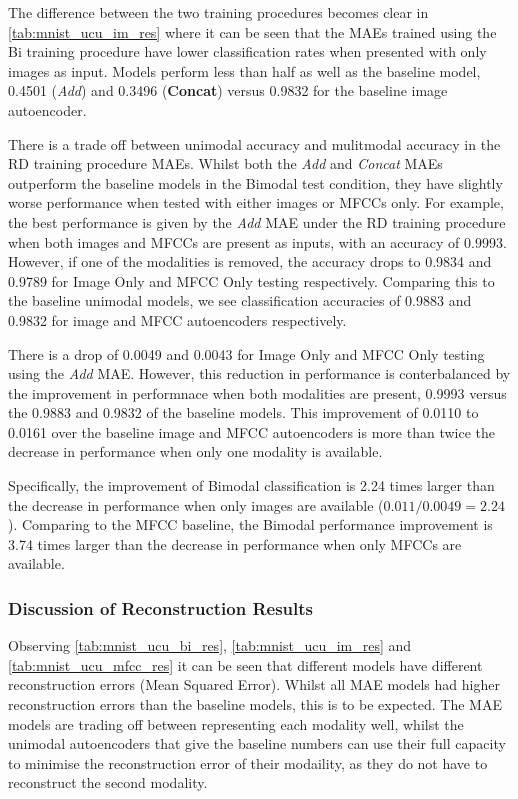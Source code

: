 The difference between the two training procedures becomes clear in \autoref{tab:mnist_ucu_im_res} where it can be seen that the MAEs trained using the Bi training procedure have lower classification rates when presented with only images as input. Models perform less than half as well as the baseline model, 0.4501 (\textit{Add}) and 0.3496 (\textbf{Concat}) versus 0.9832 for the baseline image autoencoder.

There is a trade off between unimodal accuracy and mulitmodal accuracy in the RD training procedure MAEs. Whilst both the \textit{Add} and \textit{Concat} MAEs outperform the baseline models in the Bimodal test condition, they have slightly worse performance when tested with either images or MFCCs only. For example, the best performance is given by the \textit{Add} MAE under the RD training procedure when both images and MFCCs are present as inputs, with an accuracy of 0.9993. However, if one of the modalities is removed, the accuracy drops to 0.9834 and 0.9789 for Image Only and MFCC Only testing respectively. Comparing this to the baseline unimodal models, we see classification accuracies of 0.9883 and 0.9832 for image and MFCC autoencoders respectively. 

There is a drop of 0.0049 and 0.0043 for Image Only and MFCC Only testing using the \textit{Add} MAE. However, this reduction in performance is conterbalanced by the improvement in performnace when both modalities are present, 0.9993 versus the 0.9883 and 0.9832 of the baseline models. This improvement of 0.0110 to 0.0161 over the baseline image and MFCC autoencoders is more than twice the decrease in performance when only one modality is available. 

Specifically, the improvement of Bimodal classification is 2.24 times larger than the decrease in performance when only images are available ($0.011 / 0.0049 = 2.24$). Comparing to the MFCC baseline, the Bimodal performance improvement is 3.74 times larger than the decrease in performance when only MFCCs are available.

\subsubsection{Discussion of Reconstruction Results}
Observing \autoref{tab:mnist_ucu_bi_res}, \autoref{tab:mnist_ucu_im_res} and \autoref{tab:mnist_ucu_mfcc_res} it can be seen that different models have different reconstruction errors (Mean Squared Error). Whilst all MAE models had higher reconstruction errors than the baseline models, this is to be expected. The MAE models are trading off between representing each modality well, whilst the unimodal autoencoders that give the baseline numbers can use their full capacity to minimise the reconstruction error of their modaility, as they do not have to reconstruct the second modality. 

